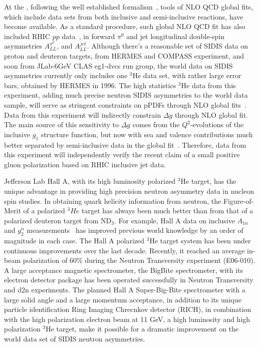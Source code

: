 At the \nloo, following the well established formalism~\cite{PhysRevLett.101.072001},
tools of NLO QCD global fits, which include data sets from both inclusive and semi-inclusive reactions,
have become available.   As a standard procedure,  such global NLO QCD fit
has also included RHIC $pp$ data~\cite{deFlorian:2014yva}, in forward $\pi^0$ and jet longitudinal double-spin asymmetries $A_{LL}^{\pi^0}$, and $A_{LL}^{jet}$. 
Although there's a reasonable  set of SIDIS  data on proton and deuteron targets, from HERMES and COMPASS experiment, and soon from JLab-6GeV CLAS eg1-dvcs run group,  the world data on SIDIS asymmetries  currently only includes
one $^3$He data set, with rather large error bars, obtained by HERMES in 1996.
The high statistics $^3$He data from this experiment, adding much precise
 neutron SIDIS asymmetries to the world data sample,  
will serve as stringent constraints on pPDFs through NLO global fits~\cite{epjcxj2006}. 
Data from this experiment  will  indirectly constrain  $\Delta g$   through NLO global fit. 
The main source of this sensitivity to $\Delta g$ comes from 
the $Q^2$-evolutions of the inclusive $g_1$ structure function, but now with 
 sea and valence contributions much better
 separated by semi-inclusive data in the global fit~\cite{sassotnlo,epjcxj2006}.
Therefore,  data from this experiment will  independently verify 
the recent claim of a small positive gluon polarization based on RHIC inclusive jet data. 

Jefferson Lab Hall A, with its high luminosity polarized $^3$He target, has the unique
advantage in providing high precision neutron asymmetry data in nucleon spin studies. 
In obtaining quark helicity information from neutron,  the Figure-of-Merit of  a polarized $^3He$ target has always been much better than from that of a polarized deuteron target from ND$_3$.
For example, Hall A data on inclusive  $A_{1n}$ and $g_2^n$ measurements~\cite{xiaochao,kevin}
has improved previous world knowledge by an order of magnitude in each case. 
The Hall A polarized $^3$He target system has been under continuous improvements over 
the last decade.  Recently, it reached an average in-beam polarization of 60$\%$  
during the Neutron Transversity experiment (E06-010).
A large acceptance magnetic spectrometer, the BigBite spectrometer, with its electron detector package
has been operated successfully in Neutron Transversity and d2n experiments. 
The planned Hall A Super-Big-Bite spectrometer with  a large solid angle and a large momentum acceptance, in addition to its unique particle identification Ring Imaging Chrecnkov  detector (RICH), 
in  combination with the high polarization electron beam at 11 GeV, 
a high luminosity and high polarization $^3$He target,  make it possible for a dramatic improvement on the world data set of 
SIDIS neutron asymmetries.

